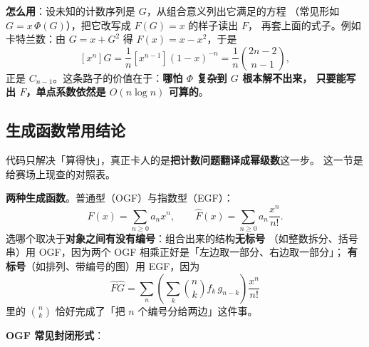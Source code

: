 		\textbf{怎么用}：设未知的计数序列是 $G$，从组合意义列出它满足的方程
		（常见形如 $G = x\,\Phi(G)$），把它改写成 $F(G) = x$ 的样子读出 $F$，
		再套上面的式子。例如卡特兰数：由 $G = x + G^2$ 得 $F(x) = x - x^2$，于是
		\[
			[x^n]G = \frac1n [x^{n-1}](1-x)^{-n} = \frac1n\binom{2n-2}{n-1},
		\]
		正是 $C_{n-1}$。这条路子的价值在于：\textbf{哪怕 $\Phi$ 复杂到 $G$ 根本解不出来，
		只要能写出 $F$，单点系数依然是 $O(n\log n)$ 可算的}。

		\subsection{生成函数常用结论}

		代码只解决「算得快」，真正卡人的是\textbf{把计数问题翻译成幂级数}这一步。
		这一节是给赛场上现查的对照表。

		\textbf{两种生成函数}。普通型（OGF）与指数型（EGF）：
		$$F(x) = \sum_{n \ge 0} a_n x^n, \qquad
		  \hat F(x) = \sum_{n \ge 0} a_n \frac{x^n}{n!} .$$
		选哪个取决于\textbf{对象之间有没有编号}：组合出来的结构\textbf{无标号}
		（如整数拆分、括号串）用 OGF，因为两个 OGF 相乘正好是「左边取一部分、右边取一部分」；
		\textbf{有标号}（如排列、带编号的图）用 EGF，因为
		$$\hat F \hat G = \sum_n \left(\sum_{k} \binom{n}{k} f_k\, g_{n-k}\right)\frac{x^n}{n!}$$
		里的 $\binom{n}{k}$ 恰好完成了「把 $n$ 个编号分给两边」这件事。

		\textbf{OGF 常见封闭形式}：

